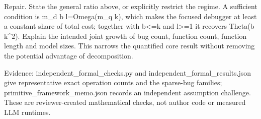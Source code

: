 \documentclass[10pt]{article}
\begin{document}
Repair. State the general ratio above, or explicitly restrict the regime. A sufficient condition is m\_d b l=Omega(m\_q k), which makes the focused debugger at least a constant share of total cost; together with b<=k and l>=1 it recovers Theta(b k\textasciicircum{}2). Explain the intended joint growth of bug count, function count, function length and model sizes. This narrows the quantified core result without removing the potential advantage of decomposition.\par
Evidence: independent\_formal\_checks.py and independent\_formal\_results.json give representative exact operation counts and the sparse-bug families; primitive\_framework\_memo.json records an independent assumption challenge. These are reviewer-created mathematical checks, not author code or measured LLM runtimes.\par
\end{document}
